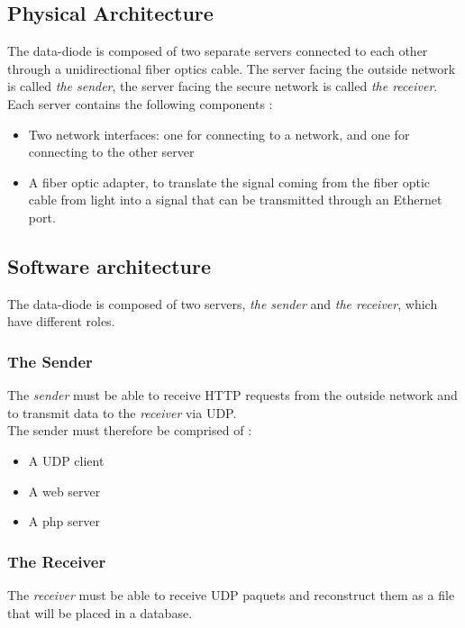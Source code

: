 \documentclass[a4paper,11pt]{article}
\begin{document}
\begin{center}
\begin{tabular}{cc}
\end{tabular}
\end{center} 




\subsection{Physical Architecture}
The data-diode is composed of two separate servers connected to each other through a unidirectional fiber optics cable. The server facing the outside network is called \textit{the sender}, the server facing the secure network is called \textit{the receiver}.\\

Each server contains the following components :
\begin{itemize}
\item{Two network interfaces: one for connecting to a network, and one for connecting to the other server}
\item{A fiber optic adapter, to translate the signal coming from the fiber optic cable from light into a signal that can be transmitted through an Ethernet port.}
\end{itemize}

\subsection{Software architecture}
The data-diode is composed of two servers, \textit{the sender} and \textit{the receiver}, which have different roles. 

\subsubsection{The Sender}
The \textit{sender} must be able to receive HTTP requests from the outside network and to transmit data to the \textit{receiver} via UDP.\\

The sender must therefore be comprised of :
\begin{itemize}
\item{A UDP client}
\item{A web server}
\item{A php server}
\end{itemize} 

\subsubsection{The Receiver}
The \textit{receiver} must be able to receive UDP paquets and reconstruct them as a file that will be placed in a database. \\
\end{document}
